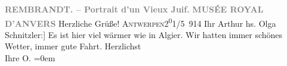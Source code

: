 \begin{ledgroupsized}[t]{13cm}
           \noindent{}\centering{}{\pb}\textcolor{gray}{\textbf{REMBRANDT. – Portrait d’un Vieux Juif.}}\pend
           \pstart
           \noindent{}\centering{}\textcolor{gray}{\textbf{MUSÉE ROYAL D’ANVERS}}\pend
           \pstart
           {\pb}Herzliche Grüße!\pend
           \pstart
           \textsc{Antwerpen}2\substVorne{}\textsuperscript{0}\substDazwischen{}1\substHinten{}/5 914\pend
           \pstart Ihr \spacefill\mbox{Arthur}\pend{}\pstart
           \noindent{}{[}hs. Olga Schnitzler:{]} Es ist hier viel wärmer wie in Algier. Wir hatten immer schönes Wetter, immer gute
               Fahrt.\pend
           \pstart
           Herzlichst{\\[\baselineskip]}Ihre \spacefill\mbox{O.}\pend
           \leftskip=0em{}
         
         \endnumbering{}\end{ledgroupsized}  \newcommand{\dateiname}{L02180}\newcommand{\titel}{Arthur und Olga Schnitzler an Richard und Paula Beer-Hofmann, 21. 5. 1914}\newcommand{\editorInnen}{Martin Anton Müller und Gerd-Hermann Susen}
      